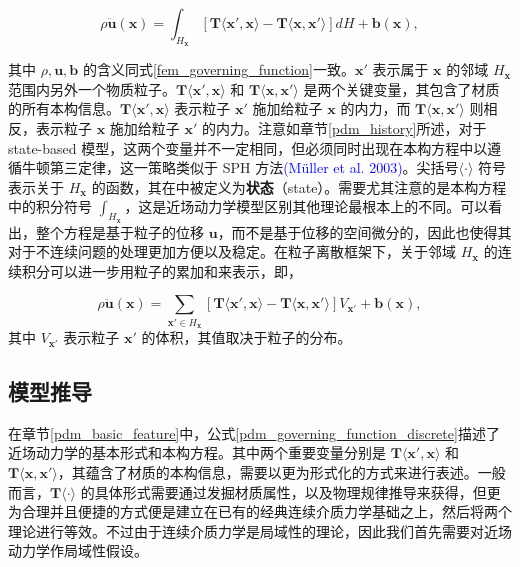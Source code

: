 \begin{equation}
\rho\ddot{\mathbf{u}}(\mathbf{x}) = \int_{H_\mathbf{x}}[\mathbf{T}\langle\mathbf{x}',\mathbf{x}\rangle - \mathbf{T}\langle\mathbf{x},\mathbf{x}'\rangle]dH+\mathbf{b}(\mathbf{x}),
\label{pdm_governing_function}
\end{equation}

其中 $\rho, \mathbf{u}, \mathbf{b}$ 的含义同式\ref{fem_governing_function}一致。$\mathbf{x}'$ 表示属于 $\mathbf{x}$ 的邻域 $H_\mathbf{x}$ 范围内另外一个物质粒子。$\mathbf{T}\langle\mathbf{x}',\mathbf{x}\rangle$ 和 $\mathbf{T}\langle\mathbf{x},\mathbf{x}'\rangle$ 是两个关键变量，其包含了材质的所有本构信息。$\mathbf{T}\langle\mathbf{x}',\mathbf{x}\rangle$ 表示粒子 $\mathbf{x}'$ 施加给粒子 $\mathbf{x}$ 的内力，而 $\mathbf{T}\langle\mathbf{x},\mathbf{x}'\rangle$ 则相反，表示粒子 $\mathbf{x}$ 施加给粒子 $\mathbf{x}'$ 的内力。注意如章节\ref{pdm_history}所述，对于 state-based 模型，这两个变量并不一定相同，但必须同时出现在本构方程中以遵循牛顿第三定律，这一策略类似于 SPH 方法\textcolor{blue}{(M\"{u}ller et al. 2003)\supercite{Muller2003}}。尖括号$\langle\cdot\rangle$ 符号表示关于 $H_\mathbf{x}$ 的函数，其在中被定义为\textbf{状态}（state）。需要尤其注意的是本构方程中的积分符号 $\int_{H_\mathbf{x}}$，这是近场动力学模型区别其他理论最根本上的不同。可以看出，整个方程是基于粒子的位移 $\mathbf{u}$，而不是基于位移的空间微分的，因此也使得其对于不连续问题的处理更加方便以及稳定。在粒子离散框架下，关于邻域 $H_\mathbf{x}$ 的连续积分可以进一步用粒子的累加和来表示，即，

\begin{equation}
\rho\ddot{\mathbf{u}}(\mathbf{x}) = \sum_{\mathbf{x}'\in H_\mathbf{x}}[\mathbf{T}\langle\mathbf{x}',\mathbf{x}\rangle - \mathbf{T}\langle\mathbf{x},\mathbf{x}'\rangle]V_{\mathbf{x}'}+\mathbf{b}(\mathbf{x}),
\label{pdm_governing_function_discrete}
\end{equation}
其中 $V_{\mathbf{x}'}$ 表示粒子 $\mathbf{x}'$ 的体积，其值取决于粒子的分布。

\subsection{模型推导}
\label{pdm_derivation}

在章节\ref{pdm_basic_feature}中，公式\ref{pdm_governing_function_discrete}描述了近场动力学的基本形式和本构方程。其中两个重要变量分别是 $\mathbf{T}\langle\mathbf{x}',\mathbf{x}\rangle$ 和 $\mathbf{T}\langle\mathbf{x},\mathbf{x}'\rangle$，其蕴含了材质的本构信息，需要以更为形式化的方式来进行表述。一般而言，$\mathbf{T}\langle\cdot\rangle$ 的具体形式需要通过发掘材质属性，以及物理规律推导来获得，但更为合理并且便捷的方式便是建立在已有的经典连续介质力学基础之上，然后将两个理论进行等效。不过由于连续介质力学是局域性的理论，因此我们首先需要对近场动力学作局域性假设。

